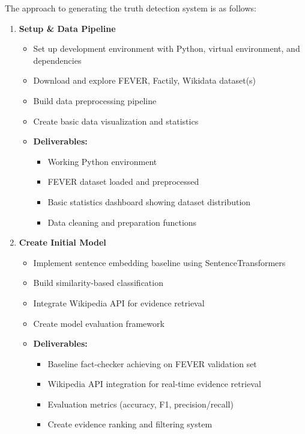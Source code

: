 \documentclass[11pt,letterpaper]{article}
\begin{document}
{The approach to generating the truth detection system is as follows:


\begin{enumerate}[label=\textbf{Week \arabic*:}]
    \item \textbf{Setup \& Data Pipeline}
    \begin{itemize}[label=$\bullet$]
        \item Set up development environment with Python, virtual environment, and dependencies
        \item Download and explore FEVER, Factily, Wikidata dataset(s)
        \item Build data preprocessing pipeline
        \item Create basic data visualization and statistics
        \item \textbf{Deliverables:}
            \begin{itemize}[label=$\square$]
                \item Working Python environment
                \item FEVER dataset loaded and preprocessed
                \item Basic statistics dashboard showing dataset distribution
                \item Data cleaning and preparation functions
            \end{itemize}
    \end{itemize}
        

    \item \textbf{Create Initial Model}
    \begin{itemize}[label=$\bullet$]
        \item Implement sentence embedding baseline using SentenceTransformers
        \item Build similarity-based classification
        \item Integrate Wikipedia API for evidence retrieval
        \item Create model evaluation framework
        \item \textbf{Deliverables:}
        \begin{itemize}[label=$\square$]
            \item Baseline fact-checker achieving on FEVER validation set
            \item Wikipedia API integration for real-time evidence retrieval
            \item Evaluation metrics (accuracy, F1, precision/recall)
            \item Create evidence ranking and filtering system
        \end{itemize}
    \end{itemize}



\end{enumerate}}
\end{document}
